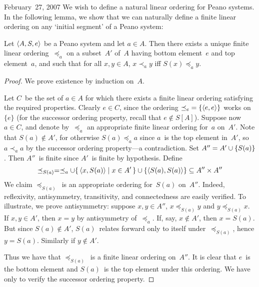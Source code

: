 \begin{lecture}{February~27, 2007}
We wish to define a natural linear ordering for Peano systems. In the following lemma, we show that we can naturally define a finite linear ordering on any `initial segment' of a Peano system:
\begin{lem}
Let \(\langle{A},{{S},{e}}\rangle\) be a Peano system and let \(a\in A\). Then there exists a unique finite linear ordering~\(\preceq_a\) on a subset~\(A'\) of~\(A\) having bottom element~\(e\) and top element~\(a\), and such that for all \(x,y\in A\), \(x\prec_a y\) iff \(S(x)\preceq_a y\).
\end{lem}
\begin{proof}
We prove existence by induction on~\(A\).

Let \(C\)~be the set of \(a\in A\) for which there exists a finite linear ordering satisfying the required properties. Clearly \(e\in C\), since the ordering \({\preceq_e}=\{\langle{e},{e}\rangle\}\) works on~\(\{e\}\) (for the successor ordering property, recall that \(e\not\in S[A]\)). Suppose now \(a\in C\), and denote by~\(\preceq_a\) an appropriate finite linear ordering for~\(a\) on~\(A'\). Note that \(S(a)\not\in A'\), for otherwise \(S(a)\preceq_a a\) since \(a\)~is the top element in~\(A'\), so \(a\prec_a a\) by the successor ordering property---a contradiction. Set \(A''=A'\cup\{S(a)\}\). Then \(A''\)~is finite since \(A'\)~is finite by hypothesis. Define
\[\preceq_{S(a)}=\preceq_a\cup\{\,\langle{x},{S(a)}\rangle\mid x\in A'\,\}\cup\{\langle{S(a)},{S(a)}\rangle\}\subseteq A''\times A''\]
We claim \(\preceq_{S(a)}\)~is an appropriate ordering for~\(S(a)\) on~\(A''\). Indeed, reflexivity, antisymmetry, transitivity, and connectedness are easily verified. To illustrate, we prove antisymmetry: suppose \(x,y\in A''\), \(x\preceq_{S(a)} y\) and \(y\preceq_{S(a)} x\). If \(x,y\in A'\), then \(x=y\) by antisymmetry of~\(\preceq_a\). If, say, \(x\not\in A'\), then \(x=S(a)\). But since \(S(a)\not\in A'\), \(S(a)\)~relates forward only to itself under~\(\preceq_{S(a)}\), hence \(y=S(a)\). Similarly if \(y\not\in A'\).

Thus we have that \(\preceq_{S(a)}\)~is a finite linear ordering on~\(A''\). It is clear that \(e\)~is the bottom element and \(S(a)\)~is the top element under this ordering. We have only to verify the successor ordering property.


\end{proof}
\end{lecture}

